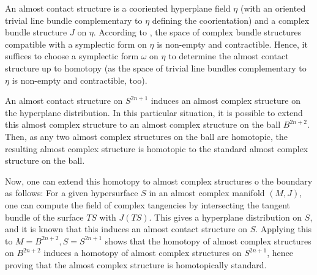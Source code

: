 \begin{definition}
    An almost contact structure is a cooriented hyperplane field $\eta$ (with an oriented trivial line bundle complementary to $\eta$ defining the coorientation) 
    and a complex bundle structure $J$ on $\eta$.
    According to \cite[Prop 2.4.5]{Geiges08}, the space of complex bundle structures compatible with a symplectic form on $\eta$ is non-empty and contractible. 
    Hence, it suffices to choose a symplectic form $\omega$ on $\eta$ to determine the almost contact structure up to homotopy 
    (as the space of trivial line bundles complementary to $\eta$ is non-empty and contractible, too).
\end{definition}

An almost contact structure on $S^{2n+1}$ induces an almost complex structure on the hyperplane distribution.
In this particular situation, it is possible to extend this almost complex structure to an almost complex structure on the ball $B^{2n+2}$.
Then, as any two almost complex structures on the ball are homotopic, the resulting almost complex structure is homotopic to the
standard almost complex structure on the ball.

Now, one can extend this homotopy to almost complex structures o the boundary as follows: 
For a given hypersurface $S$ in an almost complex manifold $(M, J)$, one can compute the field of complex tangencies by intersecting
the tangent bundle of the surface $TS$ with $J(TS)$. 
This gives a hyperplane distribution on $S$, and it is known that this induces an almost contact structure on $S$.
Applying this to $M = B^{2n+2}, S = S^{2n+1}$ shows that the homotopy of almost complex structures on $B^{2n+2}$ 
induces a homotopy of almost complex structures on $S^{2n+1}$, hence proving that the almost complex structure is homotopically standard.